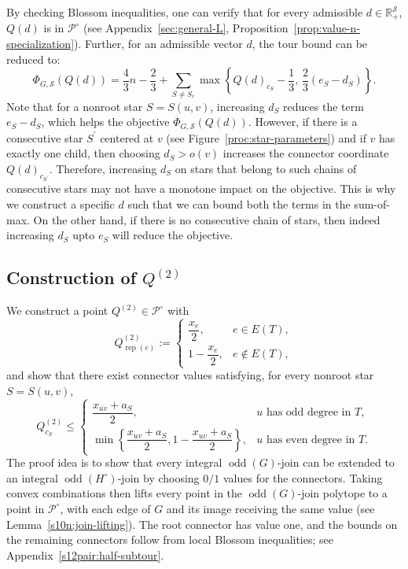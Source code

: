 \documentclass[11pt]{amsart}
\DeclareMathOperator{\odd}{odd}
\newcommand{\rep}[1]{\operatorname{rep}(#1)}
\newcommand{\1}{\mathbbm{1}}
\begin{document}
By checking Blossom inequalities, one can verify that for every admissible $d \in \mathbb{R}_+^{\mathcal S}$, $Q(d)$ is in ${\mathcal P}^{\circ}$ (see Appendix~\ref{sec:general-L}, Proposition~\ref{prop:value-n-specialization}). Further, for an admissible vector $d$, the tour bound can be reduced to: 
\begin{equation}\label{proc:increased-cost}
 \Phi_{G,\mathcal S}(Q(d))
 =\frac43n-\frac23+
 \sum_{S\ne S_r}\max\left\{
     Q(d)_{c_S}-\frac13,\,
     \frac23(e_S-d_S)\right\}.
\end{equation}
{Note that for a nonroot star $S=S(u,v)$, increasing $d_S$ reduces
the term $e_S-d_S$, which helps the objective $\Phi_{G, \mathcal{S}}(Q(d))$. However, if there is a consecutive star $S^\prime$ centered at $v$ (see Figure~\ref{proc:star-parameters}) and if $v$ has exactly one child, then choosing $d_S>o(v)$ increases
the connector coordinate $Q(d)_{c_{S^\prime}}$. Therefore, increasing $d_S$ on stars that belong to such chains of consecutive stars may not have a monotone impact on the objective. This is why we construct a specific $d$ such that we can bound both the terms in the sum-of-max. On the other hand, if there is no consecutive chain of stars, then indeed increasing $d_S$ upto $e_S$ will reduce the objective.}




 


\subsection{Construction of $Q^{(2)}$}
\label{proc:mixing}
We construct a point
$Q^{(2)}\in\mathcal P^\circ$ with
\[
 Q^{(2)}_{\rep{e}} :=
 \begin{cases}
  \dfrac{x_e}{2},&e\in E(T),\\[5pt]
  1-\dfrac{x_e}{2},&e\notin E(T),
 \end{cases}
\]
and show that there exist connector values satisfying, for every nonroot star
$S=S(u,v)$,
\begin{equation}\label{proc:connector-bounds}
 Q^{(2)}_{c_S}\le
 \begin{cases}
  \dfrac{x_{uv}+a_S}{2},
     &\text{$u$ has odd degree in $T$},\\[6pt]
  \min\left\{\dfrac{x_{uv}+a_S}{2},
              1-\dfrac{x_{uv}+a_S}{2}\right\},
     &\text{$u$ has even degree in $T$}.
 \end{cases}
\end{equation}
The proof idea is to show that every integral $\odd(G)$-join
can be extended to an integral $\odd(H^\circ)$-join by choosing
$0/1$ values for the connectors. Taking convex combinations
then lifts every point in the $\odd(G)$-join polytope to a
point in $\mathcal P^\circ$, with each edge of $G$ and its
image receiving the same value
(see Lemma~\ref{s10n:join-lifting}).
The root connector has value one, and the bounds on the
remaining connectors follow from local Blossom inequalities;
see Appendix~\ref{s12pair:half-subtour}.
\end{document}
